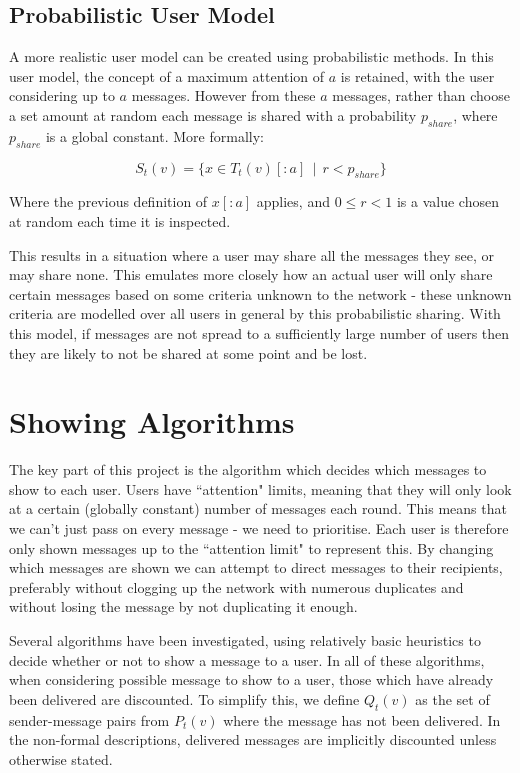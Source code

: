 \documentclass[bsc,frontabs,twoside,singlespacing,parskip,deptreport]{infthesis}     %
\begin{document}
\subsection{Probabilistic User Model}
A more realistic user model can be created using probabilistic methods. In this user model, the concept of a maximum attention of $a$ is retained, with the user considering up to $a$ messages. However from these $a$ messages, rather than choose a set amount at random each message is shared with a probability $p_{share}$, where $p_{share}$ is a global constant. More formally:

\begin{equation}
S_{t}(v) = \{x \in T_{t}(v)[:a] \:\: | \:\:  r < p_{share}\}
\end{equation}

Where the previous definition of $x[:a]$ applies, and $0 \leq r < 1$ is a value chosen at random each time it is inspected. 

This results in a situation where a user may share all the messages they see, or may share none. This emulates more closely how an actual user will only share certain messages based on some criteria unknown to the network - these unknown criteria are modelled over all users in general by this probabilistic sharing. With this model, if messages are not spread to a sufficiently large number of users then they are likely to not be shared at some point and be lost.

\section{Showing Algorithms} \label{sec:showing_algorithms}
The key part of this project is the algorithm which decides which messages to show to each user. Users have ``attention" limits, meaning that they will only look at a certain (globally constant) number of messages each round. This means that we can't just pass on every message - we need to prioritise. Each user is therefore only shown messages up to the ``attention limit" to represent this. By changing which messages are shown we can attempt to direct messages to their recipients, preferably without clogging up the network with numerous duplicates and without losing the message by not duplicating it enough.

Several algorithms have been investigated, using relatively basic heuristics to decide whether or not to show a message to a user. In all of these algorithms, when considering possible message to show to a user, those which have already been delivered are discounted. To simplify this, we define $Q_{t}(v)$ as the set of sender-message pairs from $P_{t}(v)$ where the message has not been delivered. In the non-formal descriptions, delivered messages are implicitly discounted unless otherwise stated.
\end{document}
